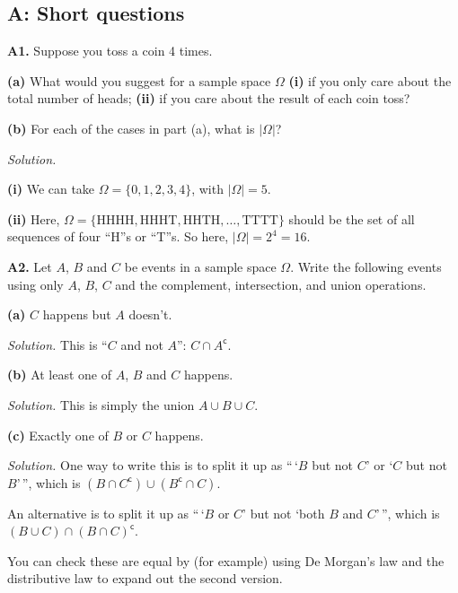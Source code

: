 \documentclass[
  a4paper,
]{book}
\theoremstyle{definition}
\theoremstyle{definition}
\theoremstyle{definition}
\theoremstyle{definition}
\theoremstyle{remark}
\begin{document}
\hypertarget{P2-short-solutions}{%
\subsection*{A: Short questions}\label{P2-short-solutions}}

\textbf{A1.} Suppose you toss a coin 4 times.

\textbf{(a)} What would you suggest for a sample space \(\Omega\) \textbf{(i)} if you only care about the total number of heads; \textbf{(ii)} if you care about the result of each coin toss?

\textbf{(b)} For each of the cases in part (a), what is \(|\Omega|\)?

\begin{myanswers}
\emph{Solution.}

\textbf{(i)} We can take \(\Omega = \{0,1,2,3,4\}\), with \(|\Omega| = 5\).

\textbf{(ii)} Here, \(\Omega = \{ \text{HHHH}, \text{HHHT}, \text{HHTH},\dots, \text{TTTT} \}\) should be the set of all sequences of four ``H''s or ``T''s. So here, \(|\Omega| = 2^4 = 16\).

\end{myanswers}

\textbf{A2.} Let \(A\), \(B\) and \(C\) be events in a sample space \(\Omega\). Write the following events using only \(A\), \(B\), \(C\) and the complement, intersection, and union operations.

\textbf{(a)} \(C\) happens but \(A\) doesn't.

\begin{myanswers}
\emph{Solution.} This is ``\(C\) and not \(A\)'': \(C\cap A^{\mathsf{c}}\).

\end{myanswers}

\textbf{(b)} At least one of \(A\), \(B\) and \(C\) happens.

\begin{myanswers}
\emph{Solution.} This is simply the union \(A \cup B\cup C\).

\end{myanswers}

\textbf{(c)} Exactly one of \(B\) or \(C\) happens.

\begin{myanswers}
\emph{Solution.} One way to write this is to split it up as ``\,`\(B\) but not \(C\)' or `\(C\) but not \(B\)'\,'', which is \((B \cap C^{\mathsf{c}}) \cup (B^{\mathsf{c}} \cap C)\).

An alternative is to split it up as ``\,`\(B\) or \(C\)' but not `both \(B\) and \(C\)'\,'', which is \((B \cup C) \cap (B\cap C)^{\mathsf{c}}\).

You can check these are equal by (for example) using De Morgan's law and the distributive law to expand out the second version.

\end{myanswers}
\end{document}
